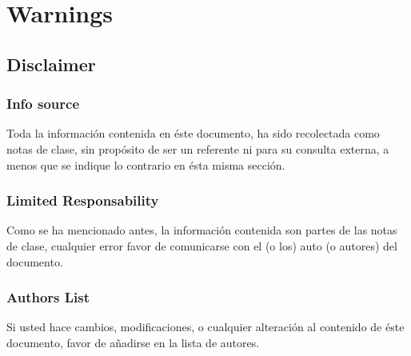 \newpage
\part{Warnings}
\chapter{Disclaimer}
\section{Info source}
Toda la informaci\'{o}n contenida en \'{e}ste documento, ha sido recolectada como notas de clase, sin prop\'{o}sito de ser un referente ni para su consulta externa, a menos que se indique lo contrario en \'{e}sta misma secci\'{o}n.

\section{Limited Responsability}
Como se ha mencionado antes, la informaci\'{o}n contenida son partes de las notas de clase, cualquier error favor de comunicarse con el (o los) auto (o autores) del documento.

\section{Authors List}
Si usted hace cambios, modificaciones, o cualquier alteraci\'{o}n al contenido de \'{e}ste documento, favor de a\~{n}adirse en la lista de autores.